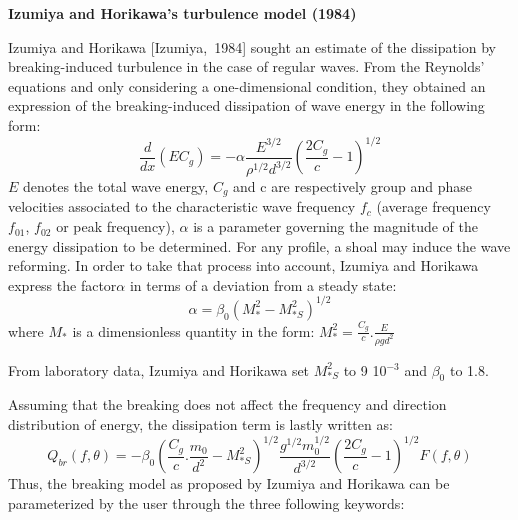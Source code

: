 {\bf  Izumiya and Horikawa's turbulence model (1984)}

 Izumiya and Horikawa [Izumiya,~1984] sought an estimate of the dissipation by breaking-induced turbulence in the case of regular waves. From the Reynolds' equations and only considering a one-dimensional condition, they obtained an expression of the breaking-induced dissipation of wave energy in the following form:
\begin{equation} \label{GrindEQ__4_53_}
\frac{d}{dx} \left(EC_{g} \right)=-\alpha \frac{E^{3/2} }{\rho ^{1/2} d^{3/2} } \left(\frac{2C_{g} }{c} -1\right)^{1/2}
\end{equation}
$E$ denotes the total wave energy, $C_{g} $ and c are respectively group and phase velocities associated to the characteristic wave frequency $f_{c} $ (average frequency $f_{01} $, $f_{02} $ or peak frequency), $\alpha $ is a parameter governing the magnitude of the energy dissipation to be determined. For any profile, a shoal may induce the wave reforming. In order to take that process into account, Izumiya and Horikawa express the factor$\alpha $ in terms of a deviation from a steady state:
\[\alpha =\beta _{0} \left(M_{*}^{2} -M_{*S}^{2} \right)^{1/2} \]
where $M_{*}^{} $ is a dimensionless quantity in the form:  $M_{*}^{2} =\frac{C_{g} }{c} .\frac{E}{\rho gd^{2} } $

 From laboratory data, Izumiya and Horikawa set $M_{*S}^{2} $ to 9 10${}^{-3}$ and $\beta _{0} $ to 1.8.

 Assuming that the breaking does not affect the frequency and direction distribution of energy, the dissipation term is lastly written as:
\begin{equation} \label{GrindEQ__4_54_}
Q_{br} \left(f,\theta \right)=-\beta _{0} \left(\frac{C_{g} }{c} .\frac{m_{0} }{d^{2} } -M_{*S}^{2} \right)^{1/2} \frac{g^{1/2} m_{0}^{1/2} }{d^{3/2} } \left(\frac{2C_{g} }{c} -1\right)^{1/2} F\left(f,\theta \right)
\end{equation}
Thus, the breaking model as proposed by Izumiya and Horikawa can be parameterized by the user through the three following keywords:

